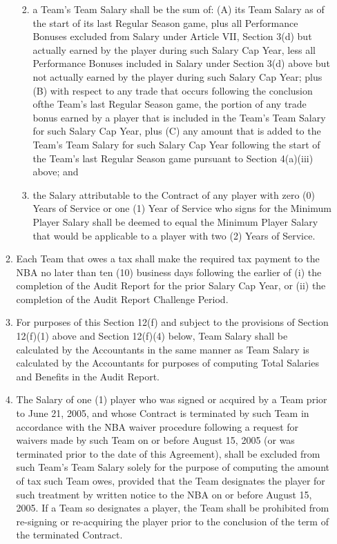 \documentclass[
]{book}
\providecommand{\tightlist}{%
  \setlength{\itemsep}{0pt}\setlength{\parskip}{0pt}}
\begin{document}
\begin{enumerate}
\begin{enumerate}
    \begin{enumerate}
    \def\labelenumiii{(\roman{enumiii})}
    \tightlist
    \item
      a Team's Team Salary shall be the sum of: (A) its Team Salary as of the start of its last Regular Season game, plus all Performance Bonuses excluded from Salary under Article VII, Section 3(d) but actually earned by the player during such Salary Cap Year, less all Performance Bonuses included in Salary under Section 3(d) above but not actually earned by the player during such Salary Cap Year; plus (B) with respect to any trade that occurs following the conclusion ofthe Team's last Regular Season game, the portion of any trade bonus earned by a player that is included in the Team's Team Salary for such Salary Cap Year, plus (C) any amount that is added to the Team's Team Salary for such Salary Cap Year following the start of the Team's last Regular Season game pursuant to Section 4(a)(iii) above; and
    \item
      the Salary attributable to the Contract of any player with zero (0) Years of Service or one (1) Year of Service who signs for the Minimum Player Salary shall be deemed to equal the Minimum Player Salary that would be applicable to a player with two (2) Years of Service.
    \end{enumerate}
  \item
    Each Team that owes a tax shall make the required tax payment to the NBA no later than ten (10) business days following the earlier of (i) the completion of the Audit Report for the prior Salary Cap Year, or (ii) the completion of the Audit Report Challenge Period.
  \item
    For purposes of this Section 12(f) and subject to the provisions of Section 12(f)(1) above and Section 12(f)(4) below, Team Salary shall be calculated by the Accountants in the same manner as Team Salary is calculated by the Accountants for purposes of computing Total Salaries and Benefits in the Audit Report.
  \item
    The Salary of one (1) player who was signed or acquired by a Team prior to June 21, 2005, and whose Contract is terminated by such Team in accordance with the NBA waiver procedure following a request for waivers made by such Team on or before August 15, 2005 (or was terminated prior to the date of this Agreement), shall be excluded from such Team's Team Salary solely for the purpose of computing the amount of tax such Team owes, provided that the Team designates the player for such treatment by written notice to the NBA on or before August 15, 2005. If a Team so designates a player, the Team shall be prohibited from re-signing or re-acquiring the player prior to the conclusion of the term of the terminated Contract.

\end{enumerate}
\end{enumerate}
\end{document}
